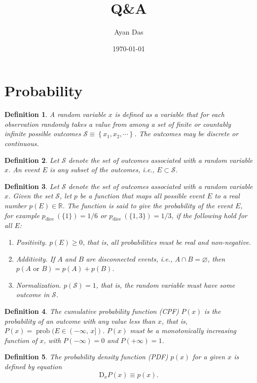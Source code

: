 \documentclass[11pt]{article}
\author{Ayan Das}
\date{\today}
\title{Q\&A}
\newtheorem{definition}{Definition}
\begin{document}
\maketitle

\section*{Probability}
\label{sec:org7133609}
\begin{definition}
A random variable \(x\) is defined as a variable that for each observation randomly takes a value from among a set of finite or countably infinite possible outcomes \(\mathcal{S} \equiv\left\{x_{1}, x_{2}, \cdots\right\}\).
The outcomes may be discrete or continuous.
\label{org209571a}
\end{definition}
\begin{definition}
Let \(\mathcal{S}\) denote the set of outcomes associated with a random variable \(x\). An event \(E\) is any subset of the outcomes, i.e., \(E \subset \mathcal{S}\).
\label{org3c6f532}
\end{definition}
\begin{definition}
Let \(\mathcal{S}\) denote the set of outcomes associated with a random variable \(x\). Given the set \(\mathcal{S}\), let \(p\) be a function that maps all possible event \(E\) to a real number \(p(E) \in \mathbb{R}\). The function is said to give the probability of the event \(E\), for example \(p_{\text {dice }}(\{1\})=1 / 6\) or \(p_{\text {dice }}(\{1,3\})=1 / 3\), if the following hold for all \(E\):
\begin{enumerate}
\item Positivity. \(p(E) \geq 0\), that is, all probabilities must be real and non-negative.
\item Additivity. If \(A\) and \(B\) are disconnected events, i.e., \(A \cap B = \varnothing\), then \(p(A \text{ or } B)=p(A)+p(B)\).
\item Normalization. \(p(\mathcal{S})=1\), that is, the random variable must have some outcome in \(\mathcal{S}\).
\end{enumerate}
\label{orgc7d0b59}
\end{definition}
\begin{definition}
The cumulative probability function (CPF) \(P(x)\) is the probability of an outcome with any value less than \(x\), that is, \(P(x)=\operatorname{prob}(E \in (-\infty,\,x])\). \(P(x)\) must be a monotonically increasing function of \(x\), with \(P(-\infty)=0\) and \(P(+\infty)=1\).
\label{org91f8155}
\end{definition}
\begin{definition}
The probability density function (PDF) \(p(x)\) for a given \(x\) is defined by equation
\[
\mathrm{D}_{x} P(x) \equiv p(x).
\]
\label{orga94e6ec}
\end{definition}
\label{sec:org1b217f8}
\end{document}
